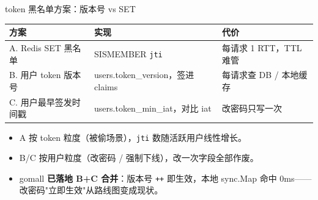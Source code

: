 \documentclass[aspectratio=169,11pt]{beamer}
\begin{document}
\begin{frame}[shrink]{token 黑名单方案：版本号 vs SET}
\begin{tabular}{@{}lll@{}}
\toprule
方案 & 实现 & 代价 \\
\midrule
A. Redis SET 黑名单     & SISMEMBER \texttt{jti}            & 每请求 1 RTT，TTL 难管 \\
B. 用户 token 版本号    & users.token\_version，签进 claims & 每请求查 DB / 本地缓存 \\
C. 用户最早签发时间戳   & users.token\_min\_iat，对比 iat  & 改密码只写一次 \\
\bottomrule
\end{tabular}
\vspace{2mm}
\begin{itemize}
  \item A 按 token 粒度（被偷场景），\texttt{jti} 数随活跃用户线性增长。
  \item B/C 按用户粒度（改密码 / 强制下线），改一次字段全部作废。
  \item gomall \textbf{已落地 B+C 合并}：版本号 \texttt{++} 即生效，本地 sync.Map 命中 0ms——改密码"立即生效"从路线图变成现状。
\end{itemize}
\end{frame}
\end{document}
